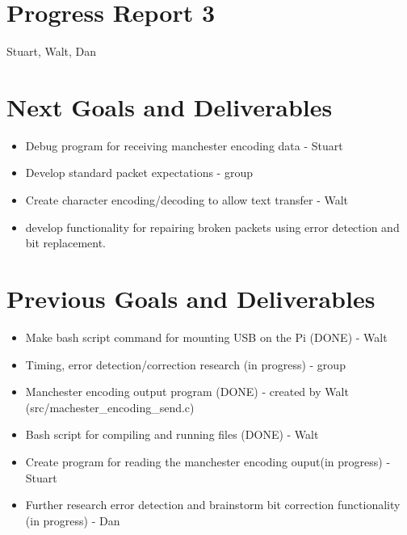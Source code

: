 \documentclass{article}
\begin{document}
\section*{Progress Report 3}
Stuart, Walt, Dan

\section*{Next Goals and Deliverables}
\begin{itemize}
\item Debug program for receiving manchester encoding data - Stuart
\item Develop standard packet expectations - group
\item Create character encoding/decoding to allow text transfer - Walt
\item develop functionality for repairing broken packets using error detection and bit replacement.
\end{itemize}

\section*{Previous Goals and Deliverables}
\begin{itemize}
    \item Make bash script command for mounting USB on the Pi (DONE) - Walt
    \item Timing, error detection/correction research (in progress) - group
    \item Manchester encoding output program (DONE) - created by Walt (src/machester\_encoding\_send.c)
    \item Bash script for compiling and running files (DONE) - Walt
    \item Create program for reading the manchester encoding ouput(in progress) - Stuart
    \item Further research error detection and brainstorm bit correction functionality (in progress) - Dan
\end{itemize}

\end{document}
